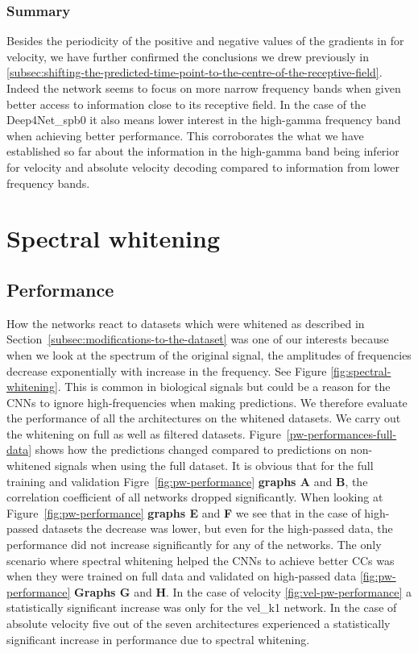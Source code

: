 \subsubsection{Summary}\label{subsubsec:across-shiftig-summary}
Besides the periodicity of the positive and negative values of the gradients in for velocity, we have further confirmed the conclusions we drew previously in \ref{subsec:shifting-the-predicted-time-point-to-the-centre-of-the-receptive-field}. 
Indeed the network seems to focus on more narrow frequency bands when given better access to information close to its receptive field.
In the case of the Deep4Net\_spb0 it also means lower interest in the high-gamma frequency band when achieving better performance.
This corroborates the what we have established so far about the information in the high-gamma band being inferior for velocity and absolute velocity decoding compared to information from lower frequency bands. 


\section{Spectral whitening}\label{sec:spectral-whitening}


\subsection{Performance}\label{subsec:pw-performance}
How the networks react to datasets which were whitened as described in Section~\ref{subsec:modifications-to-the-dataset} was one of our interests because when we look at the spectrum of the original signal, the amplitudes of frequencies decrease exponentially with increase in the frequency.
See Figure \ref{fig:spectral-whitening}.
This is common in biological signals but could be a reason for the CNNs to ignore high-frequencies when making predictions.
We therefore evaluate the performance of all the architectures on the whitened datasets. 
We carry out the whitening on full as well as filtered datasets. 
Figure~\ref{pw-performances-full-data} shows how the predictions changed compared to predictions on non-whitened signals when using the full dataset.
It is obvious that for the full training and validation Figre~\ref{fig:pw-performance} \textbf{graphs A} and \textbf{B}, the correlation coefficient of all networks dropped significantly.
When looking at Figure~\ref{fig:pw-performance} \textbf{graphs E} and \textbf{F} we see that in the case of high-passed datasets the decrease was lower, but even for the high-passed data, the performance did not increase significantly for any of the networks.
The only scenario where spectral whitening helped the CNNs to achieve better CCs was when they were trained on full data and validated on high-passed data \ref{fig:pw-performance} \textbf{Graphs G} and \textbf{H}. 
In the case of velocity \ref{fig:vel-pw-performance} a statistically significant increase was only for the vel\_k1 network.
In the case of absolute velocity five out of the seven architectures experienced a statistically significant increase in performance due to spectral whitening.\\

